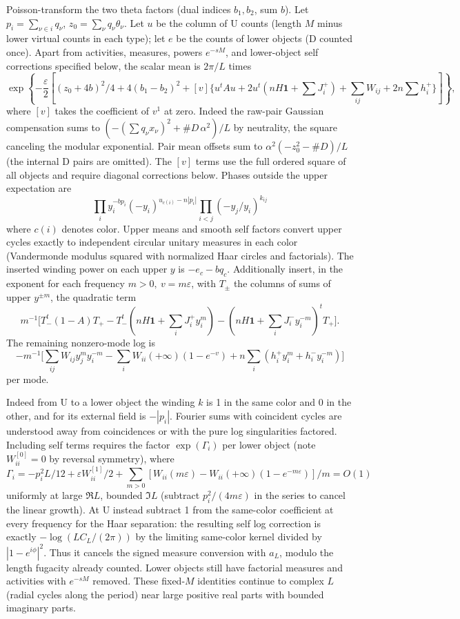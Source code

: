Poisson-transform the two theta factors (dual indices \(b_1,b_2\), sum \(b\)). Let \(p_i=\sum_{\nu\in i}q_\nu\), \(z_0=\sum_\nu q_\nu\theta_\nu\). Let \(u\) be the column of U counts (length \(M\) minus lower virtual counts in each type); let \(e\) be the counts of lower objects (D counted once). Apart from activities, measures, powers \(e^{-sM}\), and lower-object self corrections specified below, the scalar mean is \(2\pi/L\) times
\[
 \exp\left\{-\frac{\varepsilon}2\left[
 (z_0+4b)^2/4+4(b_1-b_2)^2
 +[v]\{u^t A u+2u^t(nH\mathbf1+\sum J_i^+)
 +\sum_{ij} W_{ij}+2n\sum h_i^+\}\right]\right\},
\]
where \([v]\) takes the coefficient of \(v^1\) at zero. Indeed the raw-pair Gaussian compensation sums to \((-(\sum q_\nu x_\nu)^2+\#D\,\alpha^2)/L\) by neutrality, the square canceling the modular exponential. Pair mean offsets sum to \(\alpha^2(-z_0^2-\#D)/L\) (the internal D pairs are omitted). The \([v]\) terms use the full ordered square of all objects and require diagonal corrections below. Phases outside the upper expectation are
\[
 \prod_i y_i^{-b p_i}(-y_i)^{u_{c(i)}-n |p_i|}
 \prod_{i<j}(-y_j/y_i)^{k_{ij}}
\]
where \(c(i)\) denotes color. Upper means and smooth self factors convert upper cycles exactly to independent circular unitary measures in each color (Vandermonde modulus squared with normalized Haar circles and factorials). The inserted winding power on each upper \(y\) is \(-e_{c}-bq_c\). Additionally insert, in the exponent for each frequency \(m>0,\ v=m\varepsilon\), with \(T_\pm\) the columns of sums of upper \(y^{\pm m}\), the quadratic term
\[
 m^{-1}\big[T_-^t(1-A)T_+
 -T_-^t(nH\mathbf1+\sum_i J_i^+y_i^m)
 -(nH\mathbf1+\sum_i J_i^- y_i^{-m})^t T_+\big].
\]
The remaining nonzero-mode log is
\[
 -m^{-1}\big[\sum_{ij}W_{ij} y_j^m y_i^{-m}
 -\sum_i W_{ii}(+\infty)(1-e^{-v})
 +n\sum_i(h_i^+y_i^m+h_i^- y_i^{-m})\big]
\]
per mode.

Indeed from U to a lower object the winding \(k\) is 1 in the same color and 0 in the other, and for its external field is \(-|p_i|\). Fourier sums with coincident cycles are understood away from coincidences or with the pure log singularities factored. Including self terms requires the factor \(\exp(\Gamma_i)\) per lower object (note \(W_{ii}^{[0]}=0\) by reversal symmetry), where
\[
 \Gamma_i=-p_i^2 L/12+\varepsilon W_{ii}^{[1]}/2+
 \sum_{m>0}[W_{ii}(m\varepsilon)-W_{ii}(+\infty)(1-e^{-m\varepsilon})]/m=O(1)
\]
uniformly at large \(\Re L\), bounded \(\Im L\) (subtract \(p_i^2/(4m\varepsilon)\) in the series to cancel the linear growth). At U instead subtract 1 from the same-color coefficient at every frequency for the Haar separation: the resulting self log correction is exactly \(-\log(LC_L/(2\pi))\) by the limiting same-color kernel divided by \(|1-e^{i\phi}|^2\). Thus it cancels the signed measure conversion with \(a_L\), modulo the length fugacity already counted. Lower objects still have factorial measures and activities with \(e^{-sM}\) removed. These fixed-\(M\) identities continue to complex \(L\) (radial cycles along the period) near large positive real parts with bounded imaginary parts.

